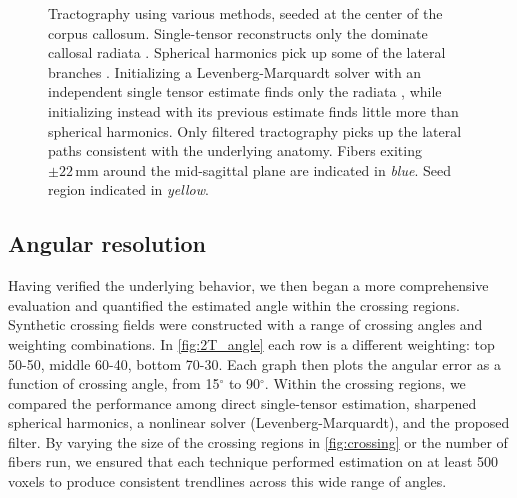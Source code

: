 \documentclass[final,hyperref]{gatech-thesis}
\renewcommand{\deg}{\ensuremath{^\circ}\xspace}
\begin{document}
\begin{figure}[t]
  \centering


  \caption{Tractography using various methods, seeded at the center of the
    corpus callosum.  Single-tensor reconstructs only the dominate callosal
    radiata .  Spherical harmonics pick up some of the
    lateral branches .  Initializing a Levenberg-Marquardt
    solver with an independent single tensor estimate finds only the radiata
    , while initializing instead with its previous estimate
     finds little more than spherical harmonics.  Only
    filtered tractography picks up the lateral paths consistent with the
    underlying anatomy.  Fibers exiting $\pm22\,\text{mm}$ around the
    mid-sagittal plane are indicated in \textit{blue}.  Seed region indicated
    in \textit{yellow}.}
  \label{fig:T_tc}
\end{figure}


\subsection{Angular resolution}  \label{sec:angle}

Having verified the underlying behavior, we then began a more comprehensive
evaluation and quantified the estimated angle within the crossing regions.
Synthetic crossing fields were constructed with a range of crossing angles and
weighting combinations.  In \autoref{fig:2T_angle} each row is a different
weighting: top 50-50, middle 60-40, bottom 70-30.  Each graph then plots the
angular error as a function of crossing angle, from 15\deg to 90\deg.  Within
the crossing regions, we compared the performance among direct single-tensor
estimation, sharpened spherical harmonics, a nonlinear solver
(Levenberg-Marquardt), and the proposed filter.
%
By varying the size of the crossing regions in \autoref{fig:crossing} or the
number of fibers run, we ensured that each technique performed estimation on
at least 500 voxels to produce consistent trendlines across this wide range of
angles.
\end{document}
